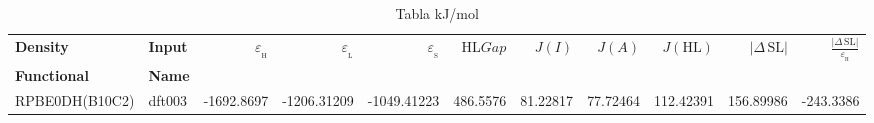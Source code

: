 \documentclass[preprint,landscape,12pt]{elsarticle}
\begin{document}
	\begin{table}
		\caption{ Tabla kJ/mol}
		\centering
		\footnotesize
		\begin{tabular}{llrrrrrrrrr}
			\hline
			\textbf{Density} & \textbf{Input} &$\varepsilon_{_{\mathrm{H}}}$	& $\varepsilon_{_{\mathrm{L}}}$  & $\varepsilon_{_{\mathrm{S}}}$& HL$Gap$ & $J(I)$ & $J(A)$ & $J(\mathrm{HL})$  & \textbf{$\left|\Delta\,\mathrm{SL}\right|$} & $\frac{\left|\Delta\,\mathrm{SL}\right|}{\varepsilon_{_{\mathrm{H}}}}$ \\
			\textbf{Functional} & \textbf{Name}&   &  &     &   &  &  &  &  &\\
			\hline \hline 

RPBE0DH(B10C2) & dft003 & -1692.8697 & -1206.31209 & -1049.41223 & 486.5576 & 81.22817 & 77.72464 & 112.42391 & 156.89986 & -243.3386\\

	 		\hline
		\end{tabular}
			\label{tab:kJ/mol}
	\end{table}
\end{document}
